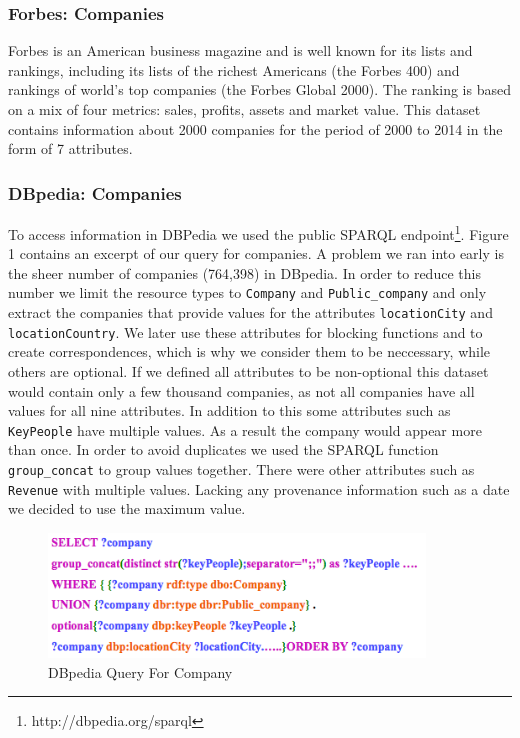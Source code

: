 \subsubsection{Forbes: Companies}
Forbes is an American business magazine and is well known for its lists and rankings, including its lists of the richest Americans (the Forbes 400) and rankings of world's top companies (the Forbes Global 2000). The ranking is based on a mix of four metrics: sales, profits, assets and market value. This dataset contains information about 2000 companies for the period of 2000 to 2014 in the form of 7 attributes.

\subsubsection{DBpedia: Companies}
To access information in DBPedia we used the public SPARQL endpoint\footnote{http://dbpedia.org/sparql}. Figure 1 contains an excerpt of our query for companies. A problem we ran into early is the sheer number of companies (764,398) in DBpedia.
In order to reduce this number we limit the resource types to \texttt{Company} and \texttt{Public\_company} and only extract the companies that provide values for the attributes \texttt{locationCity} and \texttt{locationCountry}. We later use these attributes for blocking functions and to create correspondences, which is why we consider them to be neccessary, while others are optional. If we defined all attributes to be non-optional this dataset would contain only a few thousand companies, as not all companies have all values for all nine attributes. In addition to this some attributes such as \texttt{KeyPeople} have multiple values. As a result the company would appear more than once. In order to avoid duplicates we used the SPARQL function \texttt{group\_concat} to group values together. There were other attributes such as \texttt{Revenue} with multiple values. Lacking any provenance information such as a date we decided to use the maximum value.
 
\begin{figure}[H]
	\begin{center}
	\includegraphics[width=10cm]{DB_Com}
	\caption[DBpedia Query For Company]{DBpedia Query For Company}
	\label{fig:db}
	\end{center}
\end{figure}

